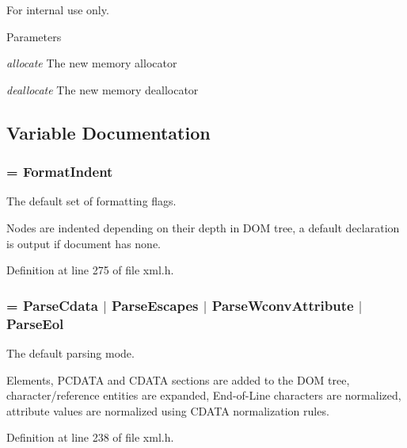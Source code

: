 \begin{DoxyInternal}{For internal use only.}

\begin{DoxyParams}{Parameters}
\item[{\em allocate}]The new memory allocator \item[{\em deallocate}]The new memory deallocator \end{DoxyParams}
\end{DoxyInternal}


\subsection{Variable Documentation}
\hypertarget{namespacephys_1_1xml_a08bf6aab51f79929d9097706a5e64408}{
\subsubsection[{FormatDefault}]{ = {\bf FormatIndent}}}
\label{d9/d27/namespacephys_1_1xml_a08bf6aab51f79929d9097706a5e64408}


The default set of formatting flags. 

Nodes are indented depending on their depth in DOM tree, a default declaration is output if document has none. 

Definition at line 275 of file xml.h.

\hypertarget{namespacephys_1_1xml_aa6b8f7f8c2322fd683a235b498834d60}{
\subsubsection[{ParseDefault}]{ = {\bf ParseCdata} $|$ {\bf ParseEscapes} $|$ {\bf ParseWconvAttribute} $|$ {\bf ParseEol}}}
\label{d9/d27/namespacephys_1_1xml_aa6b8f7f8c2322fd683a235b498834d60}


The default parsing mode. 

Elements, PCDATA and CDATA sections are added to the DOM tree, character/reference entities are expanded, End-\/of-\/Line characters are normalized, attribute values are normalized using CDATA normalization rules. 

Definition at line 238 of file xml.h.

